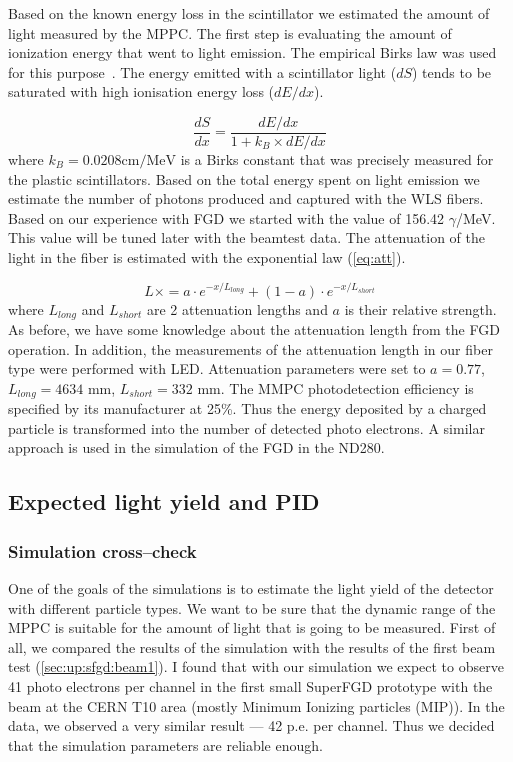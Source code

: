 \documentclass[main.tex]{subfiles}
\begin{document}
Based on the known energy loss in the scintillator we estimated the amount of light measured by the MPPC. The first step is evaluating the amount of ionization energy that went to light emission. The empirical Birks law was used for this purpose~\cite{Birks1951}. The energy emitted with a scintillator light ($dS$) tends to be saturated with high ionisation energy loss ($dE/dx$).

\begin{equation}
\frac{dS}{dx}=\frac{dE/dx}{1+k_B\times dE/dx}
\end{equation}
where $k_B=0.0208\text{cm/MeV}$ is a Birks constant that was precisely measured for the plastic scintillators. Based on the total energy spent on light emission we estimate the number of photons produced and captured with the WLS fibers. Based on our experience with FGD we started with the value of 156.42 $\gamma$/MeV. This value will be tuned later with the beamtest data. The attenuation of the light in the fiber is estimated with the exponential law (\autoref{eq:att}).

\begin{equation}
\label{eq:att}
L\times=a\cdot e^{-x/L_{long}}+(1-a)\cdot e^{-x/L_{short}}
\end{equation}
where $L_{long}$ and $L_{short}$ are 2 attenuation lengths and $a$ is their relative strength. As before, we have some knowledge about the attenuation length from the FGD operation. In addition, the measurements of the attenuation length in our fiber type were performed with LED. Attenuation parameters were set to $a=0.77$, $L_{long}=4634$ mm, $L_{short}=332$ mm. The MMPC photodetection efficiency is specified by its manufacturer at 25\%. Thus the energy deposited by a charged particle is transformed into the number of detected photo electrons. A similar approach is used in the simulation of the FGD in the ND280.

\subsection{Expected light yield and PID}
\subsubsection{Simulation cross--check}
One of the goals of the simulations is to estimate the light yield of the detector with different particle types. We want to be sure that the dynamic range of the MPPC is suitable for the amount of light that is going to be measured. First of all, we compared the results of the simulation with the results of the first beam test (\autoref{sec:up:sfgd:beam1}). I found that with our simulation we expect to observe 41 photo electrons per channel in the first small SuperFGD prototype with the beam at the CERN T10 area (mostly Minimum Ionizing particles (MIP)). In the data, we observed a very similar result --- 42 p.e. per channel. Thus we decided that the simulation parameters are reliable enough.
\end{document}
